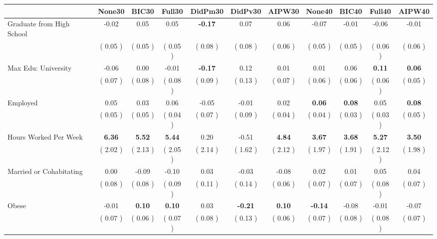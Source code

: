 \begin{tabular}{l c c c c c c c c c c}
\toprule
 & None30 & BIC30 & Full30 & DidPm30 & DidPv30 & AIPW30 & None40 & BIC40 & Full40 & AIPW40 \\
\midrule
Graduate from High School &     -0.02 &      0.05 &      0.05 & \textbf{     -0.17 } &      0.07 &      0.06 &     -0.07 &     -0.01 &     -0.06 &     -0.01 \\
& (     0.05 ) & (     0.05 ) & (     0.05 ) & (     0.08 ) & (     0.08 ) & (     0.06 ) & (     0.05 ) & (     0.05 ) & (     0.06 ) & (     0.06 ) \\
Max Edu: University &     -0.06 &      0.00 &     -0.01 & \textbf{     -0.17 } &      0.12 &      0.01 &      0.01 &      0.06 & \textbf{      0.11 } & \textbf{     0.06} \\
& (     0.07 ) & (     0.08 ) & (     0.08 ) & (     0.09 ) & (     0.13 ) & (     0.07 ) & (     0.06 ) & (     0.06 ) & (     0.06 ) & (     0.05 ) \\
Employed &      0.05 &      0.03 &      0.06 &     -0.05 &     -0.01 &      0.02 & \textbf{      0.06 } & \textbf{      0.08 } &      0.05 & \textbf{     0.08} \\
& (     0.05 ) & (     0.05 ) & (     0.04 ) & (     0.07 ) & (     0.09 ) & (     0.04 ) & (     0.04 ) & (     0.03 ) & (     0.03 ) & (     0.05 ) \\
Hours Worked Per Week & \textbf{      6.36 } & \textbf{      5.52 } & \textbf{      5.44 } &      0.20 &     -0.51 & \textbf{     4.84} & \textbf{      3.67 } & \textbf{      3.68 } & \textbf{      5.27 } & \textbf{     3.50} \\
& (     2.02 ) & (     2.13 ) & (     2.05 ) & (     2.14 ) & (     1.62 ) & (     2.12 ) & (     1.97 ) & (     1.91 ) & (     2.12 ) & (     1.98 ) \\
Married or Cohabitating &      0.00 &     -0.09 &     -0.10 &      0.03 &     -0.03 &     -0.08 &      0.02 &      0.01 &      0.05 &      0.04 \\
& (     0.08 ) & (     0.08 ) & (     0.09 ) & (     0.11 ) & (     0.14 ) & (     0.06 ) & (     0.07 ) & (     0.07 ) & (     0.08 ) & (     0.07 ) \\
Obese &     -0.01 & \textbf{      0.10 } & \textbf{      0.10 } &      0.03 & \textbf{     -0.21 } & \textbf{     0.10} & \textbf{     -0.14 } &     -0.08 &     -0.01 &     -0.07 \\
& (     0.07 ) & (     0.06 ) & (     0.07 ) & (     0.08 ) & (     0.13 ) & (     0.06 ) & (     0.07 ) & (     0.08 ) & (     0.08 ) & (     0.07 ) \\

\end{tabular}
